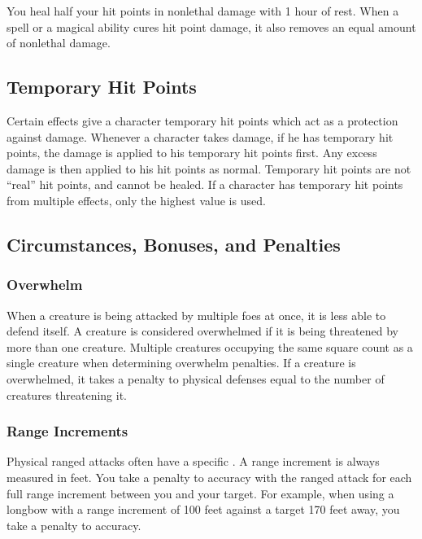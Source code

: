             You heal half your hit points in nonlethal damage with 1 hour of rest.
            When a spell or a magical ability cures hit point damage, it also removes an equal amount of nonlethal damage.

    \subsection{Temporary Hit Points}\label{Temporary Hit Points}
        Certain effects give a character temporary hit points which act as a protection against damage.
        Whenever a character takes damage, if he has temporary hit points, the damage is applied to his temporary hit points first.
        Any excess damage is then applied to his hit points as normal.
        Temporary hit points are not ``real'' hit points, and cannot be healed.
        If a character has temporary hit points from multiple effects, only the highest value is used.

    \subsection{Circumstances, Bonuses, and Penalties}

        \subsubsection{Overwhelm}\label{Overwhelm}
            When a creature is being attacked by multiple foes at once, it is less able to defend itself.
            A creature is considered overwhelmed if it is being threatened by more than one creature.
            Multiple creatures occupying the same square count as a single creature when determining overwhelm penalties.
            If a creature is overwhelmed, it takes a penalty to physical defenses equal to the number of creatures threatening it.

        \subsubsection{Range Increments}\label{Range Increments}
            Physical ranged attacks often have a specific .
            A range increment is always measured in feet.
            You take a  penalty to accuracy with the ranged attack for each full range increment between you and your target.
            For example, when using a longbow with a range increment of 100 feet against a target 170 feet away, you take a  penalty to accuracy.

